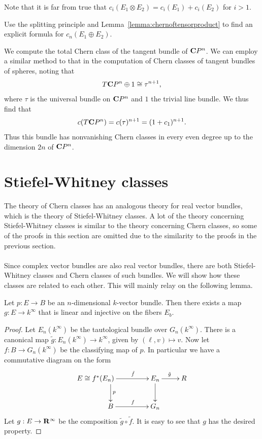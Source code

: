 \documentclass[a4paper,openany]{scrbook}
\begin{document}
Note that it is far from true that $c_i(E_1 \otimes E_2) = c_i(E_1) + c_i(E_2)$ for $i>1$.

\begin{exer}
Use the splitting principle and Lemma~\ref{lemma:chernoftensorproduct} to find an explicit formula for $c_n(E_1 \oplus E_2)$.
\end{exer}

\begin{example}\label{exa:chernclassofcpn}
We compute the total Chern class of the tangent bundle of $\mathbf C P^n$. We can employ a similar method to that in the computation of Chern classes of tangent bundles of spheres, noting that
\[
T\mathbf C P^n \oplus 1 \cong \tau^{n+1},
\]
where $\tau$ is the universal bundle on $\mathbf C P^n$ and $1$ the trivial line bundle. We thus find that
\[
c(T\mathbf C P^n) = c(\tau)^{n+1} = (1+c_1)^{n+1}.
\]
Thus this bundle has nonvanishing Chern classes in every even degree up to the dimension $2n$ of $\mathbf C P^n$.
\end{example}

\section{Stiefel-Whitney classes}
The theory of Chern classes has an analogous theory for real vector bundles, which is the theory of Stiefel-Whitney classes. A lot of the theory concerning Stiefel-Whitney classes is similar to the theory concerning Chern classes, so some of the proofs in this section are omitted due to the similarity to the proofs in the previous section.
\\\\
Since complex vector bundles are also real vector bundles, there are both Stiefel-Whitney classes and Chern classes of such bundles. We will show how these classes are related to each other. This will mainly relay on the following lemma.

\begin{lemma}\label{lemma:linearonfibers}
Let $p:E\to B$ be an $n$-dimensional $k$-vector bundle. Then there exists a map $g: E\to k^\infty$ that is linear and injective on the fibers $E_b$. 
\end{lemma}
\begin{proof}
Let $E_n(k^\infty)$ be the tautological bundle over $G_n(k^\infty)$. There is a canonical map $\tilde g: E_n(k^\infty)\to k^\infty$, given by $(\ell,v)\mapsto v$. Now let $f:B\to G_n(k^\infty)$ be the classifying map of $p$. In particular we have  a commutative diagram on the form
$$\xymatrix{*+[l]{E\cong f^*(E_n)}\ar[r]^{\tilde f}\ar[d]^p & E_n\ar[d]\ar[r]^{\tilde g} & R\\
 B\ar[r]^f & G_n
}$$
Let $g: E\to \mathbf R^\infty$ be the composition $\tilde g\circ\tilde f$. It is easy to see that $g$ has the desired property.
\end{proof}
\end{document}
